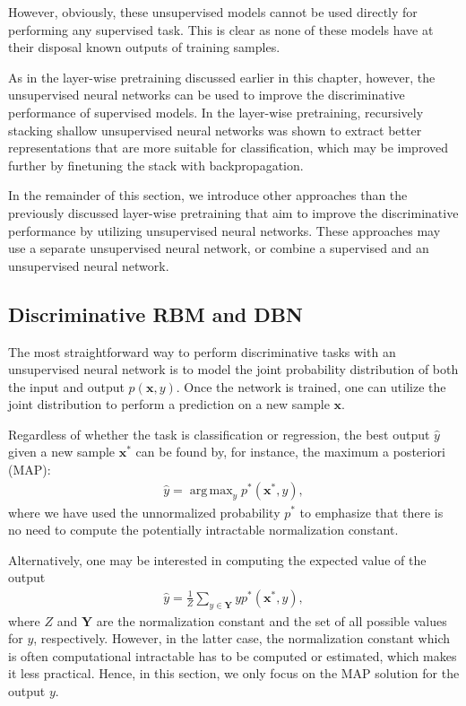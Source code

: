 \documentclass[dissertation,nocontribution,draft*]{aaltoseries}
\newcommand{\vect}[1]{\mathbf{#1}}
\newcommand{\matr}[1]{\mathbf{#1}}
\newcommand{\vx}[0]{\vect{x}}
\newcommand{\mY}[0]{\matr{Y}}
\DeclareMathOperator*{\argmax}{arg\,max}
\begin{document}
However, obviously, these unsupervised models cannot be used
directly for performing any supervised task.  This is
clear as none of these models have at their disposal known
outputs of training samples.

As in the layer-wise pretraining discussed earlier in this
chapter, however, the unsupervised neural networks can be
used to improve the discriminative performance of 
supervised models. In the layer-wise pretraining,
recursively stacking shallow unsupervised neural networks
was shown to extract better representations that are more
suitable for classification, which may be improved further by
finetuning the stack with backpropagation.

In the remainder of this section, we introduce other approaches
than the previously discussed layer-wise pretraining
that aim to improve the discriminative performance by
utilizing unsupervised neural networks. These approaches
may use a separate unsupervised neural network, or combine a
supervised and an unsupervised neural network.

\subsection{Discriminative RBM and DBN}
\label{sec:drbm}

The most straightforward way to perform discriminative tasks
with an unsupervised neural network is to model the joint
probability distribution of both the input and output
$p(\vx, y)$. Once the network is trained, one can utilize
the joint distribution to perform a prediction on a new
sample $\vx$. 

Regardless of whether the task is classification or
regression, the best output $\hat{y}$ given a new sample
$\vx^*$ can be found by, for instance, the maximum a
posteriori (MAP):
\begin{align}
    \label{eq:gen_class}
    \hat{y} = \argmax_{y} p^*(\vx^*, y),
\end{align}
where we have used the unnormalized probability $p^*$ to
emphasize that there is no need to compute the potentially
intractable normalization constant. 

Alternatively, one may be interested in computing the
expected value of the output 
\begin{align}
    \label{eq:gen_class}
    \hat{y} = \frac{1}{Z} \sum_{y \in \mY} y p^*(\vx^*, y),
\end{align}
where $Z$ and $\mY$ are the normalization constant and the
set of all possible values for $y$, respectively. However, in the
latter case, the normalization constant which is often
computational intractable has to be computed or estimated,
which makes it less practical. Hence, in this section, we
only focus on the MAP solution for the output $y$.
\end{document}
